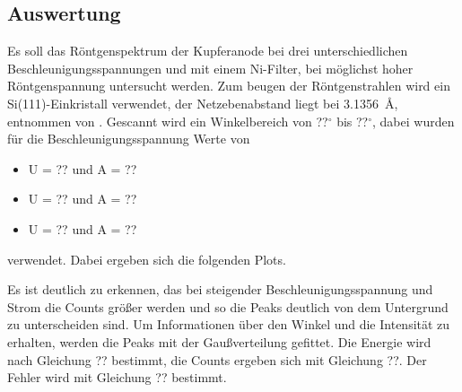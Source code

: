 \subsection{Auswertung}
Es soll das R\"ontgenspektrum der Kupferanode bei drei unterschiedlichen Beschleunigungsspannungen und mit einem Ni-Filter, bei m\"oglichst hoher R\"ontgenspannung untersucht werden.
Zum beugen der R\"ontgenstrahlen wird ein Si(111)-Einkristall verwendet, der Netzebenabstand liegt bei \SI{3,1356}{\angstrom}, entnommen von \cite{si_a}.
Gescannt wird ein Winkelbereich von ??$^\circ$ bis ??$^\circ$, dabei wurden f\"ur die Beschleunigungsspannung Werte von
\begin{itemize}
\item U = ?? und A = ??
\item U = ?? und A = ??
\item U = ?? und A = ??
\end{itemize}
 verwendet. Dabei ergeben sich die folgenden Plots.
 
 
 
Es ist deutlich zu erkennen, das bei steigender Beschleunigungsspannung und Strom die Counts gr\"o\ss er werden und so die Peaks deutlich von dem Untergrund zu unterscheiden sind.
Um Informationen \"uber den Winkel und die Intensit\"at zu erhalten, werden die Peaks mit der Gau\ss verteilung gefittet.
Die Energie wird nach Gleichung ?? bestimmt, die Counts ergeben sich mit Gleichung ??. Der Fehler wird mit Gleichung ?? bestimmt.
